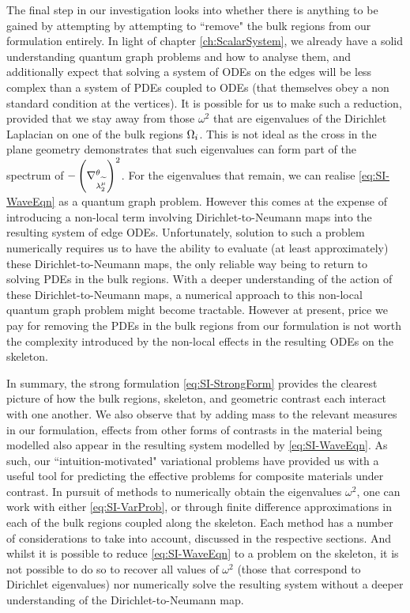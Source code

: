 The final step in our investigation looks into whether there is anything to be gained by attempting by attempting to ``remove" the bulk regions from our formulation entirely.
In light of chapter \ref{ch:ScalarSystem}, we already have a solid understanding quantum graph problems and how to analyse them, and additionally expect that solving a system of ODEs on the edges will be less complex than a system of PDEs coupled to ODEs (that themselves obey a non standard condition at the vertices).
It is possible for us to make such a reduction, provided that we stay away from those $\omega^2$ that are eigenvalues of the Dirichlet Laplacian on one of the bulk regions $\Omega_i$.
This is not ideal as the cross in the plane geometry demonstrates that such eigenvalues can form part of the spectrum of $-\left( \nabla^{\theta}_{\lambda_2^{\widetilde{\mu}}} \right)^2$.
For the eigenvalues that remain, we can realise \eqref{eq:SI-WaveEqn} as a quantum graph problem.
However this comes at the expense of introducing a non-local term involving Dirichlet-to-Neumann maps into the resulting system of edge ODEs.
Unfortunately, solution to such a problem numerically requires us to have the ability to evaluate (at least approximately) these Dirichlet-to-Neumann maps, the only reliable way being to return to solving PDEs in the bulk regions.
With a deeper understanding of the action of these Dirichlet-to-Neumann maps, a numerical approach to this non-local quantum graph problem might become tractable.
However at present, price we pay for removing the PDEs in the bulk regions from our formulation is not worth the complexity introduced by the non-local effects in the resulting ODEs on the skeleton.

In summary, the strong formulation \eqref{eq:SI-StrongForm} provides the clearest picture of how the bulk regions, skeleton, and geometric contrast each interact with one another.
We also observe that by adding mass to the relevant measures in our formulation, effects from other forms of contrasts in the material being modelled also appear in the resulting system modelled by \eqref{eq:SI-WaveEqn}.
As such, our ``intuition-motivated" variational problems have provided us with a useful tool for predicting the effective problems for composite materials under contrast.
In pursuit of methods to numerically obtain the eigenvalues $\omega^2$, one can work with either \eqref{eq:SI-VarProb}, or through finite difference approximations in each of the bulk regions coupled along the skeleton.
Each method has a number of considerations to take into account, discussed in the respective sections.
And whilst it is possible to reduce \eqref{eq:SI-WaveEqn} to a problem on the skeleton, it is not possible to do so to recover all values of $\omega^2$ (those that correspond to Dirichlet eigenvalues) nor numerically solve the resulting system without a deeper understanding of the Dirichlet-to-Neumann map.

